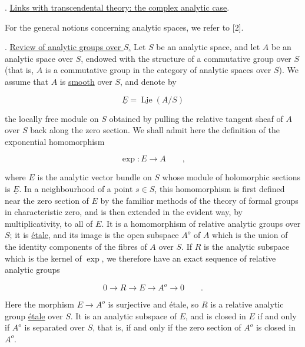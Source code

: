 \medskip
{}. \underline{Links with transcendental theory: the complex analytic
case}.

For the general notions concerning analytic spaces, we refer to [2].

\medskip
{}. \underline{Review of analytic groups over $S$.} Let $S$ be an
analytic space, and let $A$ be an analytic space over $S$, endowed with
the structure of a commutative group over $S$ (that is, $A$ is a
commutative group in the category of analytic spaces over $S$). We assume
that $A$ is \underline{smooth} over $S$, and denote by

\begin{equation}\tag{13.1.1}
 \underline E=\underline{\operatorname{Lie}}(A/S)
\end{equation}

\noindent
the locally free module on $S$ obtained by pulling the relative tangent
sheaf of $A$ over $S$ back along the zero section. We shall admit here the
definition of the exponential homomorphism

\begin{equation}\tag{13.1.2}
 \exp:E\longrightarrow A\qquad ,
\end{equation}

\noindent
where $E$ is the analytic vector bundle on $S$ whose module of
holomorphic sections is $\underline E$. In a neighbourhood of a point
$s\in S$, this homomorphism is first defined near the zero section of $E$
by the familiar methods of the theory of formal groups in characteristic
zero, and is then extended in the evident way, by multiplicativity, to
all of $E$. It is a homomorphism of relative analytic groups over $S$;
it is \underline{\'etale}, and its image is the open subspace $A^o$ of
$A$ which is the union of the identity components of the fibres of $A$
over $S$. If $R$ is the analytic subspace which is the kernel of $\exp$,
we therefore have an exact sequence of relative analytic groups

\begin{equation}\tag{13.1.3}
 0\longrightarrow R\longrightarrow E\longrightarrow A^o
 \longrightarrow0\qquad .
\end{equation}

\noindent
Here the morphism $E\longrightarrow A^o$ is surjective and \'etale, so
$R$ is a relative analytic group \underline{\'etale} over $S$. It is an
analytic subspace of $E$, and is closed in $E$ if and only if $A^o$ is
separated over $S$, that is, if and only if the zero section of $A^o$ is
closed in $A^o$.

